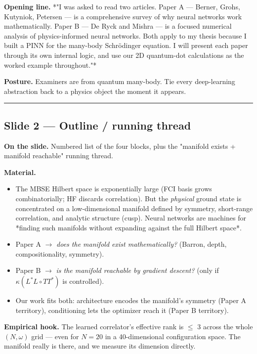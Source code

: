 \documentclass[11pt]{article}
\begin{document}
\textbf{Opening line.} *"I was asked to read two articles. Paper A --- Berner, Grohs,
Kutyniok, Petersen --- is a comprehensive survey of why neural networks work
mathematically. Paper B --- De Ryck and Mishra --- is a focused numerical analysis
of physics-informed neural networks. Both apply to my thesis because I built a
PINN for the many-body Schr\"odinger equation. I will present each paper through
its own internal logic, and use our 2D quantum-dot calculations as the worked
example throughout."*

\textbf{Posture.} Examiners are from quantum many-body. Tie every deep-learning
abstraction back to a physics object the moment it appears.

\vspace{4pt}\hrule\vspace{8pt}

\subsection*{Slide 2 --- Outline / running thread}

\textbf{On the slide.} Numbered list of the four blocks, plus the "manifold
exists + manifold reachable" running thread.

\textbf{Material.}

\begin{itemize}
\item The MBSE Hilbert space is exponentially large (FCI basis grows
combinatorially; HF discards correlation). But the \emph{physical} ground state
is concentrated on a low-dimensional manifold defined by symmetry,
short-range correlation, and analytic structure (cusp). Neural networks are
machines for *finding such manifolds without expanding against the full
Hilbert space*.
\item Paper A $\to$ \emph{does the manifold exist mathematically?} (Barron, depth,
compositionality, symmetry).
\item Paper B $\to$ \emph{is the manifold reachable by gradient descent?} (only if
$\kappa(L^*L \circ TT^*)$ is controlled).
\item Our work fits both: architecture encodes the manifold's symmetry (Paper A
territory), conditioning lets the optimizer reach it (Paper B territory).
\end{itemize}
\textbf{Empirical hook.} The learned correlator's effective rank is $\le$ 3 across the
whole $(N, \omega)$ grid --- even for $N{=}20$ in a 40-dimensional configuration
space. The manifold really is there, and we measure its dimension directly.
\end{document}
